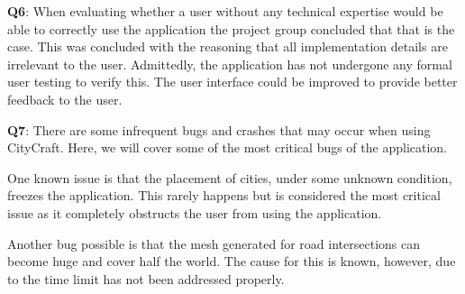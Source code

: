 \textbf{Q6}:
When evaluating whether a user without any technical expertise would be able to correctly use the application the project group concluded that that is the case.
This was concluded with the reasoning that all implementation details are irrelevant to the user.
Admittedly, the application has not undergone any formal user testing to verify this.
The user interface could be improved to provide better feedback to the user.

\textbf{Q7}:
There are some infrequent bugs and crashes that may occur when using CityCraft.
Here, we will cover some of the most critical bugs of the application.

One known issue is that the placement of cities, under some unknown condition, freezes the application.
This rarely happens but is considered the most critical issue as it completely obstructs the user from using the application.

Another bug possible is that the mesh generated for road intersections can become huge and cover half the world.
The cause for this is known, however, due to the time limit has not been addressed properly.


